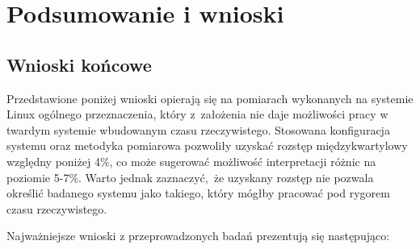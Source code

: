 
\chapter{Podsumowanie i wnioski}
\section{Wnioski końcowe}
Przedstawione poniżej wnioski opierają się na pomiarach wykonanych na systemie
Linux ogólnego przeznaczenia, który z~założenia nie daje możliwości pracy w twardym systemie wbudowanym czasu rzeczywistego.
Stosowana konfiguracja systemu oraz metodyka pomiarowa pozwoliły
uzyskać rozstęp międzykwartylowy względny poniżej 4\%, co może sugerować
możliwość interpretacji różnic na poziomie 5-7\%. Warto jednak zaznaczyć, że uzyskany rozstęp nie pozwala określić badanego systemu jako takiego, który 
mógłby pracować pod rygorem czasu rzeczywistego.

Najważniejsze wnioski z przeprowadzonych badań prezentują się następująco:


